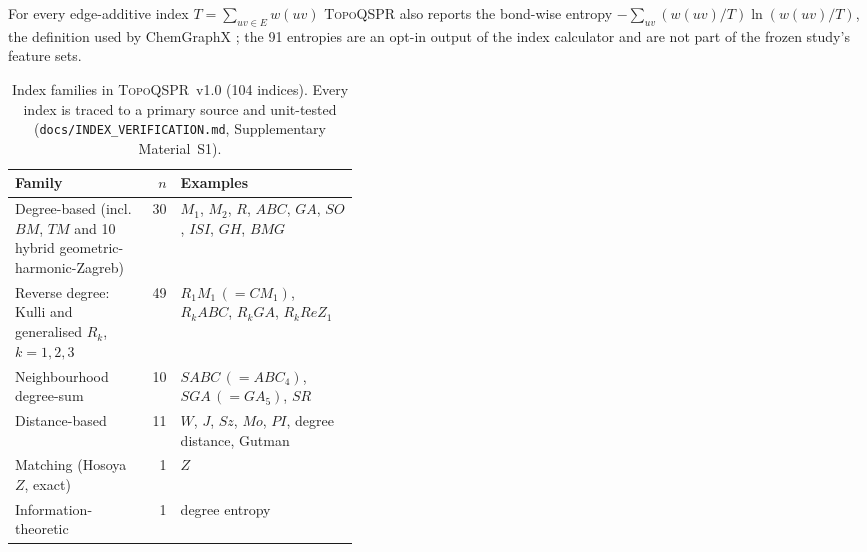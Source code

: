 \documentclass[preprint,12pt]{elsarticle}
\newcommand{\ml}{\textsc{TopoQSPR}}
\begin{document}
For every edge-additive index $T=\sum_{uv\in E}w(uv)$ \ml{} also reports the bond-wise entropy $-\sum_{uv}(w(uv)/T)\ln(w(uv)/T)$, the definition used by ChemGraphX \cite{jacob2026chemgraphx}; the 91 entropies are an opt-in output of the index calculator and are not part of the frozen study's feature sets.

\begin{table}[t]
\centering\small
\caption{Index families in \ml{}~v1.0 (104 indices). Every index is traced to a primary source and unit-tested (\texttt{docs/INDEX\_VERIFICATION.md}, Supplementary Material~S1).}
\label{tab:indices}
\begin{tabularx}{\linewidth}{>{\raggedright\arraybackslash}p{0.4\linewidth}r>{\raggedright\arraybackslash}X}
\toprule
Family & $n$ & Examples \\
\midrule
Degree-based (incl.\ $BM$, $TM$ and 10 hybrid geometric-harmonic-Zagreb) & 30 & $M_1$, $M_2$, $R$, $ABC$, $GA$, $SO$, $ISI$, $GH$, $BMG$ \\
Reverse degree: Kulli and generalised $R_k$, $k=1,2,3$ & 49 & $R_1M_1\,(=CM_1)$, $R_kABC$, $R_kGA$, $R_kReZ_1$ \\
Neighbourhood degree-sum & 10 & $S\!ABC\,(=ABC_4)$, $S\!GA\,(=GA_5)$, $S\!R$ \\
Distance-based & 11 & $W$, $J$, $Sz$, $Mo$, $PI$, degree distance, Gutman \\
Matching (Hosoya $Z$, exact) & 1 & $Z$ \\
Information-theoretic & 1 & degree entropy \\
\bottomrule
\end{tabularx}
\end{table}
\end{document}
